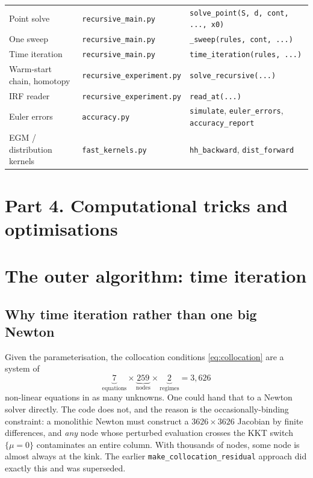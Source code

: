 \documentclass[11pt]{article}
\numberwithin{equation}{section}
\newcommand{\code}[1]{\texttt{\small #1}}
\theoremstyle{definition}
\theoremstyle{plain}
\theoremstyle{remark}
\begin{document}
\begin{longtable}{@{}p{4.6cm}p{4.4cm}p{5.4cm}@{}}
\addlinespace
Point solve
  & \code{recursive\_main.py} & \code{solve\_point(S, d, cont, ..., x0)} \\
One sweep
  & \code{recursive\_main.py} & \code{\_sweep(rules, cont, ...)} \\
Time iteration
  & \code{recursive\_main.py} & \code{time\_iteration(rules, ...)} \\
Warm-start chain, homotopy
  & \code{recursive\_experiment.py} & \code{solve\_recursive(...)} \\
IRF reader
  & \code{recursive\_experiment.py} & \code{read\_at(...)} \\
Euler errors
  & \code{accuracy.py} & \code{simulate}, \code{euler\_errors}, \code{accuracy\_report} \\
EGM / distribution kernels
  & \code{fast\_kernels.py} & \code{hh\_backward}, \code{dist\_forward} \\
\end{longtable}

\clearpage
\section*{Part 4. Computational tricks and optimisations}

\section{The outer algorithm: time iteration}
\label{sec:timeiter}

\subsection{Why time iteration rather than one big Newton}

Given the parameterisation, the collocation conditions \eqref{eq:collocation} are a
system of
\begin{equation}
\underbrace{7}_{\text{equations}}\times\underbrace{259}_{\text{nodes}}
\times\underbrace{2}_{\text{regimes}}=3{,}626
\label{eq:system-size}
\end{equation}
non-linear equations in as many unknowns. One could hand that to a Newton solver
directly. The code does not, and the reason is the occasionally-binding constraint:
a monolithic Newton must construct a $3626\times3626$ Jacobian by finite differences,
and \emph{any} node whose perturbed evaluation crosses the KKT switch
$\{\mu=0\}$ contaminates an entire column. With thousands of nodes, some node is
almost always at the kink. The earlier \code{make\_collocation\_residual} approach
did exactly this and was superseded.
\end{document}
